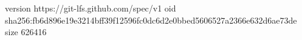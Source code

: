 version https://git-lfs.github.com/spec/v1
oid sha256:fb6d896e19e3214bff39f12596fc0dc6d2e0bbed5606527a2366e632d6ae73de
size 626416
